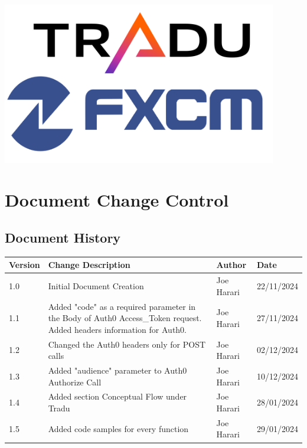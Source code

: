 \documentclass[11pt]{article}
\title{\project}
\author{Joe Harari}
\title{\project}
\begin{document}
\maketitle
\vfill
\begin{center}
    \includegraphics[width=0.9\textwidth]{tradufxcm.png}
\end{center}

\clearpage

\tableofcontents

\newpage

\section{Document Change Control}
 
\subsection{Document History}
\begin{tabular}{p{}p{}p{}p{}}\toprule
Version	& Change Description	&Author	&Date \\ \midrule
1.0 & 	Initial Document Creation	& Joe Harari & 22/11/2024\\
1.1 & 	Added "code" as a required parameter in the Body of Auth0 Access\_Token request. Added headers information for Auth0.	& Joe Harari & 27/11/2024\\
1.2 & Changed the Auth0 headers only for POST calls & Joe Harari & 02/12/2024 \\
1.3 & Added "audience" parameter to Auth0 Authorize Call & Joe Harari & 10/12/2024 \\
1.4 & Added section Conceptual Flow under Tradu & Joe Harari & 28/01/2024 \\
1.5 & Added code samples for every function & Joe Harari & 29/01/2024 \\


\bottomrule
\end{tabular}
\end{document}
